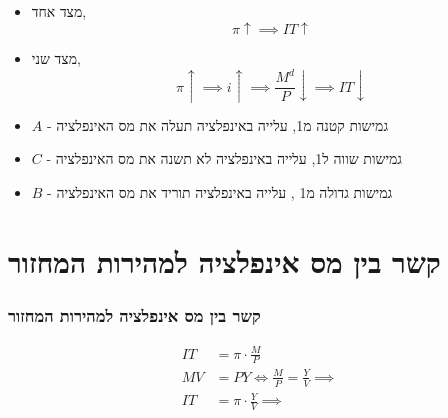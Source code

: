 \documentclass[usenames,dvipsnames]{beamer}
\begin{document}
\begin{RTL}
\begin{frame}[allowframebreaks]
    \begin{itemize}
        \item מצד אחד, $$\pi \uparrow \implies IT \uparrow$$
        \item מצד שני, $$\pi \uparrow \implies i \uparrow \implies \frac{M^d}{P} \downarrow \implies IT \downarrow$$
    \end{itemize}

    \framebreak
    \begin{center}
    \end{center}
    \begin{itemize}
        \item $A$ - גמישות קטנה מ1, עלייה באינפלציה תעלה את מס האינפלציה
        \item $C$ - גמישות שווה ל1, עלייה באינפלציה לא תשנה את מס האינפלציה
        \item $B$ - גמישות גדולה מ1 , עלייה באינפלציה תוריד את מס האינפלציה
    \end{itemize}
   

    

\end{frame}

\section{קשר בין מס אינפלציה למהירות המחזור}
\begin{frame}
    \frametitle{קשר בין מס אינפלציה למהירות המחזור}
    \begin{align*}
        IT &= \pi \cdot \frac{M}{P} \\
        MV &= PY \iff \frac{M}{P} = \frac{Y}{V} \implies \\
        IT &= \pi \cdot \frac{Y}{V} \implies
    \end{align*}


\end{frame}
\end{RTL}
\end{document}
